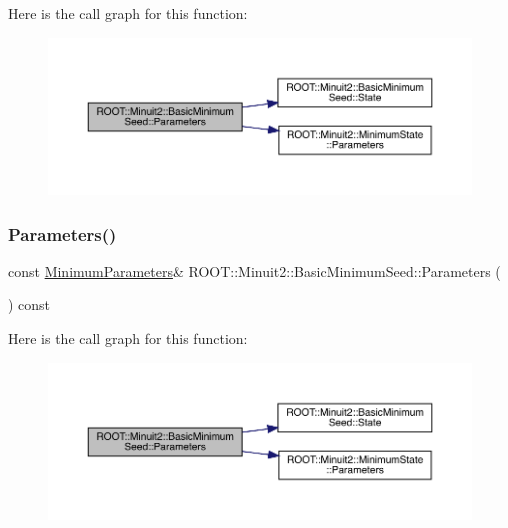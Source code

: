 Here is the call graph for this function\+:
\nopagebreak
\begin{figure}[H]
\begin{center}
\leavevmode
\includegraphics[width=350pt]{de/d50/classROOT_1_1Minuit2_1_1BasicMinimumSeed_a0aec3622cdc4f1c52a4be74f8b96059a_cgraph}
\end{center}
\end{figure}
\mbox{\label{classROOT_1_1Minuit2_1_1BasicMinimumSeed_a0aec3622cdc4f1c52a4be74f8b96059a}} 
\subsubsection{\texorpdfstring{Parameters()}{Parameters()}\hspace{0.1cm}{\footnotesize\ttfamily [2/2]}}
{\footnotesize\ttfamily const \mbox{\hyperlink{classROOT_1_1Minuit2_1_1MinimumParameters}{Minimum\+Parameters}}\& R\+O\+O\+T\+::\+Minuit2\+::\+Basic\+Minimum\+Seed\+::\+Parameters (\begin{DoxyParamCaption}{ }\end{DoxyParamCaption}) const\hspace{0.3cm}{\ttfamily [inline]}}

Here is the call graph for this function\+:
\nopagebreak
\begin{figure}[H]
\begin{center}
\leavevmode
\includegraphics[width=350pt]{de/d50/classROOT_1_1Minuit2_1_1BasicMinimumSeed_a0aec3622cdc4f1c52a4be74f8b96059a_cgraph}
\end{center}
\end{figure}
\mbox{\label{classROOT_1_1Minuit2_1_1BasicMinimumSeed_af06c66e8851f7314915e01e0bedb200c}} 

